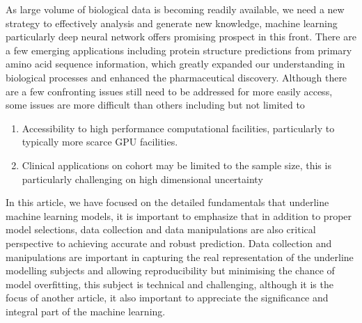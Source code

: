 As large volume of biological data is becoming readily available, we need a new strategy to effectively analysis and generate new knowledge, machine learning particularly deep neural network offers promising prospect in this front. There are a few emerging applications including protein structure predictions from primary amino acid sequence information, which greatly expanded our understanding in biological processes and enhanced the pharmaceutical discovery. Although there are a few confronting issues still need to be addressed for more easily access, some issues are more difficult than others including but not limited to 
\begin{enumerate}
    \item Accessibility to high performance computational facilities, particularly to typically more scarce GPU facilities. 
    \item Clinical applications on cohort may be limited to the sample size, this is particularly challenging on high dimensional uncertainty  
\end{enumerate}
\par
In this article, we have focused on the detailed fundamentals that underline machine learning models, it is important to emphasize that in addition to proper model selections, data collection and data manipulations are also critical perspective to achieving accurate and robust prediction. Data collection and manipulations are important in capturing the real representation of the underline modelling subjects and allowing reproducibility but minimising the chance of model overfitting, this subject is technical and challenging, although it is the focus of another article, it also important to appreciate the significance and integral part of the machine learning. 
\par 
